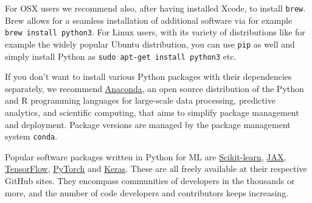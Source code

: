\documentclass[11pt,a4paper]{article}
\begin{document}
For OSX users we recommend also, after having installed Xcode, to install
\texttt{brew}.  Brew allows for a seamless installation of additional
software via for example \texttt{brew install python3}.  For Linux users,
with its variety of distributions like for example the widely popular Ubuntu
distribution, you can use \texttt{pip} as well and simply install Python as
\texttt{sudo apt-get install python3} etc.

If you don't want to install various Python packages with their dependencies
separately, we recommend \href{https://docs.anaconda.com/}{Anaconda}, an open
source distribution of the Python and R programming languages for large-scale
data processing, predictive analytics, and scientific computing, that aims to
simplify package management and deployment.  Package versions are managed by
the package management system \texttt{conda}.

Popular software packages written in Python for ML are
\href{http://scikit-learn.org/stable/}{Scikit-learn},
\href{https://jax.readthedocs.io}{JAX},
\href{https://www.tensorflow.org/}{TensorFlow},
\href{http://pytorch.org/}{PyTorch} and \href{https://keras.io/}{Keras}.
These are all freely available at their respective GitHub sites.  They
encompass communities of developers in the thousands or more, and the number
of code developers and contributors keeps increasing.
\end{document}
